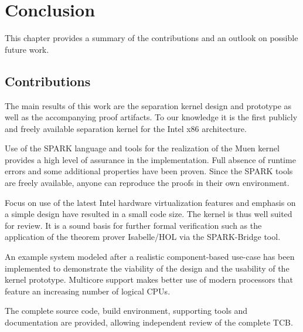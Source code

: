 \chapter{Conclusion}
This chapter provides a summary of the contributions and an outlook on possible
future work.

\section{Contributions}
The main results of this work are the separation kernel design and prototype as
well as the accompanying proof artifacts. To our knowledge it is the first
publicly and freely available separation kernel for the Intel x86 architecture.

Use of the SPARK language and tools for the realization of the Muen kernel
provides a high level of assurance in the implementation. Full absence of
runtime errors and some additional properties have been proven. Since the SPARK
tools are freely available, anyone can reproduce the proofs in their own
environment.

Focus on use of the latest Intel hardware virtualization features and emphasis
on a simple design have resulted in a small code size. The kernel is thus well
suited for review. It is a sound basis for further formal verification such as
the application of the theorem prover Isabelle/HOL via the SPARK-Bridge tool.

An example system modeled after a realistic component-based use-case has been
implemented to demonstrate the viability of the design and the usability of the
kernel prototype. Multicore support makes better use of modern processors that
feature an increasing number of logical CPUs.

The complete source code, build environment, supporting tools and documentation
are provided, allowing independent review of the complete TCB.


